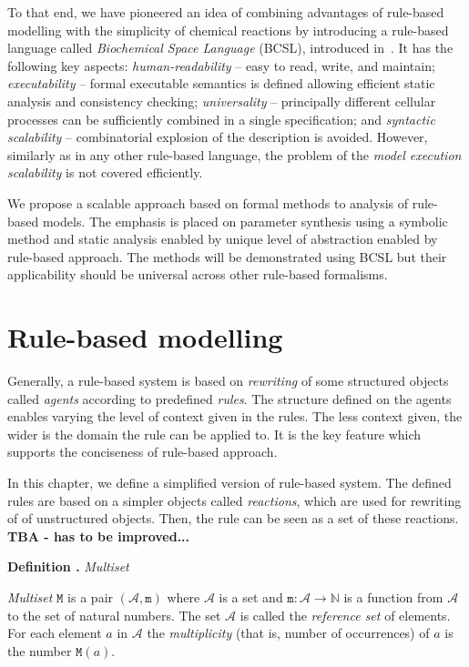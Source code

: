 \documentclass[11pt,a4paper]{report}
\newcounter{counter}[section]
\renewcommand{\thecounter}{\thechapter.\arabic{counter}}
\newenvironment{definition}[1]{\bigskip\refstepcounter{counter}\noindent\textbf{Definition \thecounter } \emph{#1} \par\nopagebreak\noindent \begin{itshape}}{\end{itshape}\bigskip}
\begin{document}
To that end, we have pioneered an idea of combining advantages of rule-based modelling with the simplicity of chemical reactions by introducing a rule-based language called \emph{Biochemical Space Language} (BCSL), introduced in~\cite{Ded201627}. It has the following key aspects: \emph{human-readability} -- easy to read, write, and maintain;
\emph{executability} -- formal executable semantics is defined allowing efficient static analysis and consistency checking; \emph{universality} -- principally different cellular processes can be sufficiently combined in a single specification; and \emph{syntactic scalability} -- combinatorial explosion of the description is avoided. However, similarly as in any other rule-based language, the problem of the \emph{model execution scalability} is not covered efficiently.

We propose a scalable approach based on formal methods to analysis of rule-based models. The emphasis is placed on parameter synthesis using a symbolic method and static analysis enabled by unique level of abstraction enabled by rule-based approach. The methods will be demonstrated using BCSL but their applicability should be universal across other rule-based formalisms.

\chapter{Rule-based modelling}
\label{formal}

Generally, a rule-based system is based on \emph{rewriting} of some structured objects called \emph{agents} according to predefined \emph{rules}. The structure defined on the agents enables varying the level of context given in the rules. The less context given, the wider is the domain the rule can be applied to. It is the key feature which supports the conciseness of rule-based approach.

In this chapter, we define a simplified version of rule-based system. The defined rules are based on a simpler objects called \emph{reactions}, which are used for rewriting of of unstructured objects. Then, the rule can be seen as a set of these reactions. \textbf{TBA - has to be improved...}

\begin{definition}{Multiset}
\emph{Multiset} $\mathtt{M}$ is a pair $(\mathcal{A}, \mathtt{m})$ where $\mathcal{A}$ is a set and $ \mathtt{m} : \mathcal{A} \rightarrow \mathbb{N} $ is a function from $\mathcal{A}$ to the set of natural numbers. The set $\mathcal{A}$ is called the \emph{reference set} of elements. For each element $\mathit{a}$ in $\mathcal{A}$ the \emph{multiplicity} (that is, number of occurrences) of $\mathit{a}$ is the number $\mathtt{M}(\mathit{a})$.
\end{definition}
\end{document}

